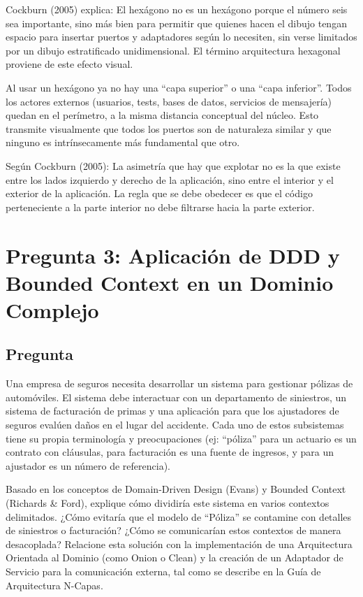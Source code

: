 \documentclass[12pt, a4paper]{article}
\begin{document}
        Cockburn (2005) explica: El hexágono no es un hexágono porque el número seis sea importante, sino más bien para permitir que quienes hacen el dibujo tengan espacio para insertar puertos y adaptadores según lo necesiten, sin verse limitados por un dibujo estratificado unidimensional. El término arquitectura hexagonal proviene de este efecto visual.

        Al usar un hexágono ya no hay una ``capa superior'' o una ``capa inferior''. Todos los actores externos (usuarios, tests, bases de datos, servicios de mensajería) quedan en el perímetro, a la misma distancia conceptual del núcleo. Esto transmite visualmente que todos los puertos son de naturaleza similar y que ninguno es intrínsecamente más fundamental que otro.

        Según Cockburn (2005): La asimetría que hay que explotar no es la que existe entre los lados izquierdo y derecho de la aplicación, sino entre el interior y el exterior de la aplicación. La regla que se debe obedecer es que el código perteneciente a la parte interior no debe filtrarse hacia la parte exterior.

        \section[Aplicación de DDD y Bounded Context en un Dominio Complejo]{Pregunta 3: Aplicación de DDD y Bounded Context en un Dominio Complejo}
        \subsection{Pregunta}
        Una empresa de seguros necesita desarrollar un sistema para gestionar pólizas de automóviles. El sistema debe interactuar con un departamento de siniestros, un sistema de facturación de primas y una aplicación para que los ajustadores de seguros evalúen daños en el lugar del accidente. Cada uno de estos subsistemas tiene su propia terminología y preocupaciones (ej: ``póliza'' para un actuario es un contrato con cláusulas, para facturación es una fuente de ingresos, y para un ajustador es un número de referencia).

        Basado en los conceptos de Domain-Driven Design (Evans) y Bounded Context (Richards \& Ford), explique cómo dividiría este sistema en varios contextos delimitados. ¿Cómo evitaría que el modelo de “Póliza” se contamine con detalles de siniestros o facturación? ¿Cómo se comunicarían estos contextos de manera desacoplada? Relacione esta solución con la implementación de una Arquitectura Orientada al Dominio (como Onion o Clean) y la creación de un Adaptador de Servicio para la comunicación externa, tal como se describe en la Guía de Arquitectura N-Capas.
\end{document}
